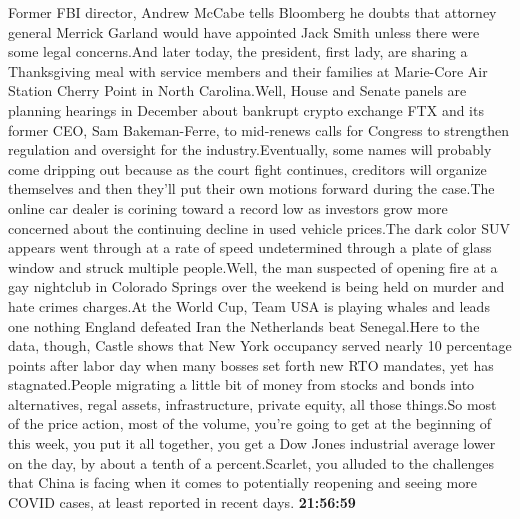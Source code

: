 \documentclass{article}%
\begin{document}
Former FBI director, Andrew McCabe tells Bloomberg he doubts that attorney general Merrick Garland would have appointed Jack Smith unless there were some legal concerns.And later today, the president, first lady, are sharing a Thanksgiving meal with service members and their families at Marie{-}Core Air Station Cherry Point in North Carolina.Well, House and Senate panels are planning hearings in December about bankrupt crypto exchange FTX and its former CEO, Sam Bakeman{-}Ferre, to mid{-}renews calls for Congress to strengthen regulation and oversight for the industry.Eventually, some names will probably come dripping out because as the court fight continues, creditors will organize themselves and then they'll put their own motions forward during the case.The online car dealer is corining toward a record low as investors grow more concerned about the continuing decline in used vehicle prices.The dark color SUV appears went through at a rate of speed undetermined through a plate of glass window and struck multiple people.Well, the man suspected of opening fire at a gay nightclub in Colorado Springs over the weekend is being held on murder and hate crimes charges.At the World Cup, Team USA is playing whales and leads one nothing England defeated Iran the Netherlands beat Senegal.Here to the data, though, Castle shows that New York occupancy served nearly 10 percentage points after labor day when many bosses set forth new RTO mandates, yet has stagnated.People migrating a little bit of money from stocks and bonds into alternatives, regal assets, infrastructure, private equity, all those things.So most of the price action, most of the volume, you're going to get at the beginning of this week, you put it all together, you get a Dow Jones industrial average lower on the day, by about a tenth of a percent.Scarlet, you alluded to the challenges that China is facing when it comes to potentially reopening and seeing more COVID cases, at least reported in recent days.%
\textbf{21:56:59}%
\newline%
\end{document}

